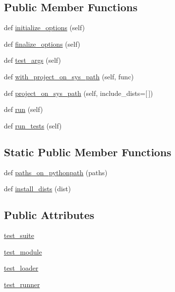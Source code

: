 \subsection*{Public Member Functions}
\begin{DoxyCompactItemize}
\item 
def \hyperlink{classsetuptools_1_1command_1_1test_1_1test_a337f4e04623d21e3cf482973c4c3a5ea}{initialize\+\_\+options} (self)
\item 
def \hyperlink{classsetuptools_1_1command_1_1test_1_1test_a11a76cb9682d8a442ca50e1a3729131f}{finalize\+\_\+options} (self)
\item 
def \hyperlink{classsetuptools_1_1command_1_1test_1_1test_a564891bf89c556a90daa47a113393637}{test\+\_\+args} (self)
\item 
def \hyperlink{classsetuptools_1_1command_1_1test_1_1test_a6031bb41469603a2f2ddc6a0ce6070e6}{with\+\_\+project\+\_\+on\+\_\+sys\+\_\+path} (self, func)
\item 
def \hyperlink{classsetuptools_1_1command_1_1test_1_1test_a0b522fa707ccd2575e5db99d32cd5226}{project\+\_\+on\+\_\+sys\+\_\+path} (self, include\+\_\+dists=\mbox{[}$\,$\mbox{]})
\item 
def \hyperlink{classsetuptools_1_1command_1_1test_1_1test_a9db00a1ed286f1957d4dd53fb4612f21}{run} (self)
\item 
def \hyperlink{classsetuptools_1_1command_1_1test_1_1test_abc29aa4e0fa9e427b0c7e08e318e2941}{run\+\_\+tests} (self)
\end{DoxyCompactItemize}
\subsection*{Static Public Member Functions}
\begin{DoxyCompactItemize}
\item 
def \hyperlink{classsetuptools_1_1command_1_1test_1_1test_a222ab40c892904a39bf415edf4b62ab4}{paths\+\_\+on\+\_\+pythonpath} (paths)
\item 
def \hyperlink{classsetuptools_1_1command_1_1test_1_1test_af0362ad01b35d885c41cb12f395c6987}{install\+\_\+dists} (dist)
\end{DoxyCompactItemize}
\subsection*{Public Attributes}
\begin{DoxyCompactItemize}
\item 
\hyperlink{classsetuptools_1_1command_1_1test_1_1test_aab9ab12c8acec96fbf5287cf81028c16}{test\+\_\+suite}
\item 
\hyperlink{classsetuptools_1_1command_1_1test_1_1test_ad820e39bc19665bd65fac656db657e60}{test\+\_\+module}
\item 
\hyperlink{classsetuptools_1_1command_1_1test_1_1test_ae12f9aa573e8fc369020284ea5cfb4b8}{test\+\_\+loader}
\item 
\hyperlink{classsetuptools_1_1command_1_1test_1_1test_aca41d56e48dcabf2067540cafc3276d5}{test\+\_\+runner}
\end{DoxyCompactItemize}
